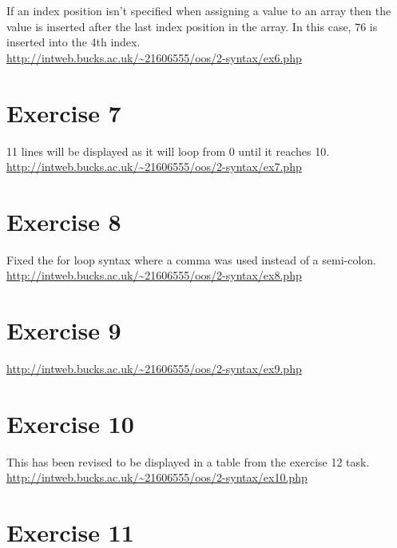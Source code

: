 If an index position isn't specified when assigning a value to an array then the value is inserted after the last index position in the array. In this case, $76$ is inserted into the 4th index.\\

\url{http://intweb.bucks.ac.uk/~21606555/oos/2-syntax/ex6.php}

\captionsetup{type=figure}

\section{Exercise 7}

11 lines will be displayed as it will loop from 0 until it reaches 10.\\

\url{http://intweb.bucks.ac.uk/~21606555/oos/2-syntax/ex7.php}

\captionsetup{type=figure}

\section{Exercise 8}

Fixed the for loop syntax where a comma was used instead of a semi-colon.\\

\url{http://intweb.bucks.ac.uk/~21606555/oos/2-syntax/ex8.php}

\captionsetup{type=figure}

\section{Exercise 9}

\url{http://intweb.bucks.ac.uk/~21606555/oos/2-syntax/ex9.php}

\captionsetup{type=figure}

\section{Exercise 10}

This has been revised to be displayed in a table from the exercise 12 task.\\

\url{http://intweb.bucks.ac.uk/~21606555/oos/2-syntax/ex10.php}

\captionsetup{type=figure}

\section{Exercise 11}

